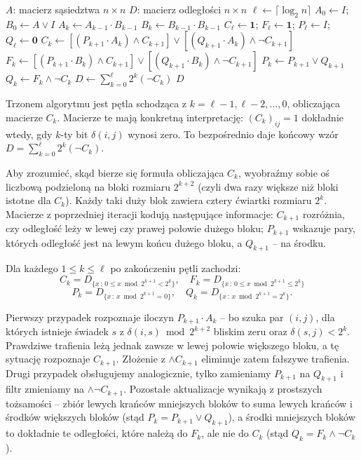 \begin{algorithm}
\caption{USP -- APSP w grafie nieważonym nieskierowanym}
\label{alg:usp}
\begin{algorithmic}[1]
\Require $A$: macierz sąsiedztwa $n \times n$
\Ensure $D$: macierz odległości $n \times n$
\State $\ell \leftarrow \lceil \log_2 n \rceil$
\State $A_0 \leftarrow I$; $B_0 \leftarrow A \vee I$
  \State $A_k \leftarrow A_{k-1} \cdot B_{k-1}$
  \State $B_k \leftarrow B_{k-1} \cdot B_{k-1}$
\EndFor
\State $C_\ell \leftarrow \mathbf{1}$; $F_\ell \leftarrow \mathbf{1}$; $P_\ell \leftarrow I$; $Q_\ell \leftarrow \mathbf{0}$
  \State $C_k \leftarrow [(P_{k+1} \cdot A_k) \wedge C_{k+1}] \vee [(Q_{k+1} \cdot A_k) \wedge \neg C_{k+1}]$
  \State $F_k \leftarrow [(P_{k+1} \cdot B_k) \wedge C_{k+1}] \vee [(Q_{k+1} \cdot B_k) \wedge \neg C_{k+1}]$
  \State $P_k \leftarrow P_{k+1} \vee Q_{k+1}$
  \State $Q_k \leftarrow F_k \wedge \neg C_k$
\EndFor
\State $D \leftarrow \sum_{k=0}^{\ell} 2^k (\neg C_k)$
\State \Return $D$
\end{algorithmic}
\end{algorithm}

Trzonem algorytmu jest pętla schodząca z $k = \ell - 1, \ell - 2, \ldots, 0$, obliczająca macierze $C_k$. Macierze te mają konkretną interpretację: $(C_k)_{ij} = 1$ dokładnie wtedy, gdy $k$-ty bit $\delta(i,j)$ wynosi zero. To bezpośrednio daje końcowy wzór $D = \sum_{k=0}^\ell 2^k (\neg C_k)$.

Aby zrozumieć, skąd bierze się formuła obliczająca $C_k$, wyobraźmy sobie oś liczbową podzieloną na bloki rozmiaru $2^{k+2}$ (czyli dwa razy większe niż bloki istotne dla $C_k$). Każdy taki duży blok zawiera cztery ćwiartki rozmiaru $2^k$. Macierze z poprzedniej iteracji kodują następujące informacje: $C_{k+1}$ rozróżnia, czy odległość leży w lewej czy prawej połowie dużego bloku; $P_{k+1}$ wskazuje pary, których odległość jest na lewym końcu dużego bloku, a $Q_{k+1}$ -- na środku.

\begin{lemat}
Dla każdego $1 \leq k \leq \ell$ po zakończeniu pętli zachodzi:
\[
C_k = D_{\{x\,:\,0 \leq x \bmod 2^{k+1} < 2^k\}}, \quad
F_k = D_{\{x\,:\,0 \leq x \bmod 2^{k+1} \leq 2^k\}}
\]
\[
P_k = D_{\{x\,:\,x \bmod 2^{k+1} = 0\}}, \quad Q_k = D_{\{x\,:\,x \bmod 2^{k+1} = 2^k\}}.
\]
\end{lemat}

Pierwszy przypadek rozpoznaje iloczyn $P_{k+1} \cdot A_k$ -- bo szuka par $(i,j)$, dla których istnieje świadek $s$ z $\delta(i,s) \bmod 2^{k+2}$ bliskim zeru oraz $\delta(s,j) < 2^k$. Prawdziwe trafienia leżą jednak zawsze w lewej połowie większego bloku, a tę sytuację rozpoznaje $C_{k+1}$. Złożenie z $\wedge C_{k+1}$ eliminuje zatem fałszywe trafienia. Drugi przypadek obsługujemy analogicznie, tylko zamieniamy $P_{k+1}$ na $Q_{k+1}$ i filtr zmieniamy na $\wedge \neg C_{k+1}$. Pozostałe aktualizacje wynikają z prostszych tożsamości -- zbiór lewych krańców mniejszych bloków to suma lewych krańców i środków większych bloków (stąd $P_k = P_{k+1} \vee Q_{k+1}$), a środki mniejszych bloków to dokładnie te odległości, które należą do $F_k$, ale nie do $C_k$ (stąd $Q_k = F_k \wedge \neg C_k$).

